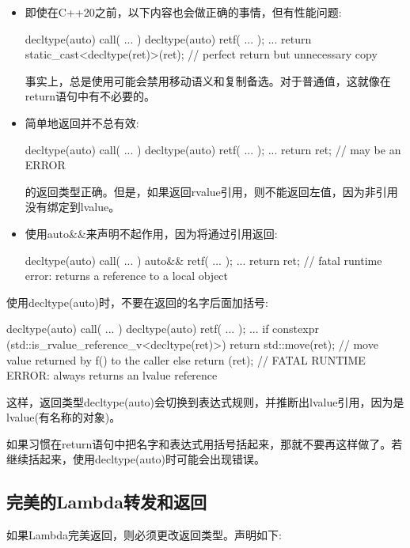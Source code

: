 \begin{itemize}
	\item 即使在C++20之前，以下内容也会做正确的事情，但有性能问题:

\begin{cppcode}
decltype(auto) call( ... )
{
	decltype(auto) ret{f( ... )};
	...
	return static_cast<decltype(ret)>(ret); // perfect return but unnecessary copy
}
\end{cppcode}
事实上，总是使用可能会禁用移动语义和复制备选。对于普通值，这就像在return语句中有不必要的。
\item 简单地返回并不总有效:
\begin{cppcode}
decltype(auto) call( ... )
{
	decltype(auto) ret{f( ... )};
	...
	return ret; // may be an ERROR
}
\end{cppcode}
的返回类型正确。但是，如果返回rvalue引用，则不能返回左值，因为非引用没有绑定到lvalue。
\item 使用auto\&\&来声明不起作用，因为将通过引用返回:
\begin{cppcode}
decltype(auto) call( ... )
{
	auto&& ret{f( ... )};
	...
	return ret; // fatal runtime error: returns a reference to a local object
}
\end{cppcode}
\end{itemize}

使用decltype(auto)时，不要在返回的名字后面加括号:

\begin{cppcode}
decltype(auto) call( ... )
{
	decltype(auto) ret{f( ... )};
	...
	if constexpr (std::is_rvalue_reference_v<decltype(ret)>) {
		return std::move(ret); // move value returned by f() to the caller
	}
	else {
		return (ret); // FATAL RUNTIME ERROR: always returns an lvalue reference
	}
}
\end{cppcode}

这样，返回类型decltype(auto)会切换到表达式规则，并推断出lvalue引用，因为是lvalue(有名称的对象)。

如果习惯在return语句中把名字和表达式用括号括起来，那就不要再这样做了。若继续括起来，使用decltype(auto)时可能会出现错误。

\subsection{完美的Lambda转发和返回}

如果Lambda完美返回，则必须更改返回类型。声明如下:

